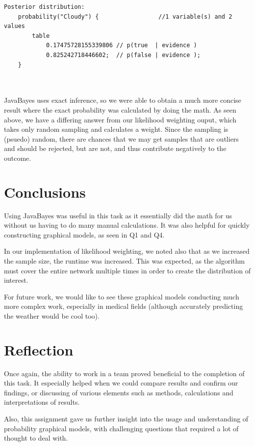 \documentclass{article}
\begin{document}
\begin{minipage}{\linewidth}
\begin{lstlisting}
Posterior distribution:
	probability("Cloudy") {                 //1 variable(s) and 2 values
		table 
			0.17475728155339806	// p(true  | evidence )
			0.825242718446602; 	// p(false | evidence );
	}
\end{lstlisting}
\end{minipage}\\
\\
JavaBayes uses exact inference, so we were able to obtain a much more concise result where the exact probability was calculated by doing the math. As seen above, we have a differing answer from our likelihood weighting ouput, which takes only random sampling and calculates a weight. Since the sampling is (psuedo) random, there are chances that we may get samples that are outliers and should be rejected, but are not, and thus contribute negatively to the outcome.

\section{Conclusions}
Using JavaBayes was useful in this task as it essentially did the math for us without us having to do many manual calculations. It was also helpful for quickly constructing graphical models, as seen in Q1 and Q4. 

In our implementation of likelihood weighting, we noted also that as we increased the sample size, the runtime was increased. This was expected, as the algorithm must cover the entire network multiple times in order to create the distribution of interest. 

For future work, we would like to see these graphical models conducting much more complex work, especially in medical fields (although accurately predicting the weather would be cool too). 

\section{Reflection}
Once again, the ability to work in a team proved beneficial to the completion of this task. It especially helped when we could compare results and confirm our findings, or discussing of various elements such as methods, calculations and interpretations of results. 

Also, this assignment gave us further insight into the usage and understanding of probability graphical models, with challenging questions that required a lot of thought to deal with.  
\end{document}
